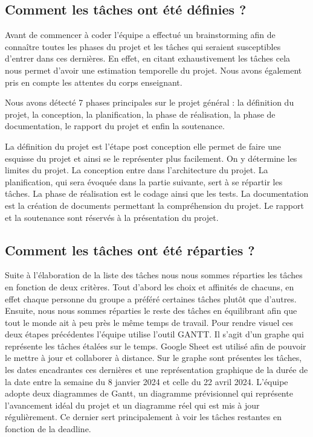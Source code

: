 \documentclass[a4paper,12pt]{article}
\begin{document}
\subsection{Comment les tâches ont été définies ?}
Avant de commencer à coder l’équipe a effectué un brainstorming afin de connaître toutes les phases du projet et les tâches qui seraient susceptibles d’entrer dans ces dernières. En effet, en citant exhaustivement les tâches cela nous permet d’avoir une estimation temporelle du projet. Nous avons également pris en compte les attentes du corps enseignant.

Nous avons détecté 7 phases principales sur le projet général : la définition du projet, la conception, la planification, la phase de réalisation, la phase de documentation, le rapport du projet et enfin la soutenance.

La définition du projet est l’étape post conception elle permet de faire une esquisse du projet et ainsi se le représenter plus facilement. On y détermine les limites du projet. La conception entre dans l’architecture du projet. La planification, qui sera évoquée dans la partie suivante, sert à se répartir les tâches. La phase de réalisation est le codage ainsi que les tests. La documentation est la création de documents permettant la compréhension du projet. Le rapport et la soutenance sont réservés à la présentation du projet.

\subsection{Comment les tâches ont été réparties ?}
Suite à l’élaboration de la liste des tâches nous nous sommes réparties les tâches en fonction de deux critères. Tout d’abord les choix et affinités de chacuns, en effet chaque personne du groupe a préféré certaines tâches plutôt que d’autres. Ensuite, nous nous sommes réparties le reste des tâches en équilibrant afin que tout le monde ait à peu près le même temps de travail.
Pour rendre visuel ces deux étapes précédentes l’équipe utilise l'outil GANTT. Il s’agit d’un graphe qui représente les tâches étalées sur le temps. Google Sheet est utilisé afin de pouvoir le mettre à jour et collaborer à distance.
Sur le graphe sont présentes les tâches, les dates encadrantes ces dernières et une représentation graphique de la durée de la date entre la semaine du 8 janvier 2024 et celle du 22 avril 2024.
L’équipe adopte deux diagrammes de Gantt, un diagramme prévisionnel qui représente l’avancement idéal du projet et un diagramme réel qui est mis à jour régulièrement. Ce dernier sert principalement à voir les tâches restantes en fonction de la deadline.
\end{document}
